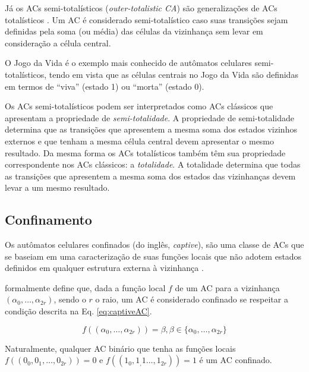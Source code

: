 Já os ACs semi-totalísticos (\textit{outer-totalistic CA}) são generalizações de ACs totalísticos \cite{weisstein2015outerTotalistic}. Um AC é considerado semi-totalístico caso suas transições sejam definidas pela soma (ou média) das células da vizinhança sem levar em consideração a célula central.

O Jogo da Vida \cite{GardnerM1970} é o exemplo mais conhecido de autômatos celulares semi-totalísticos, tendo em vista que as células centrais no Jogo da Vida são definidas em termos de ``viva'' (estado 1) ou ``morta'' (estado 0).

Os ACs semi-totalísticos podem ser interpretados como ACs clássicos que apresentam a propriedade de \textit{semi-totalidade}. A propriedade de semi-totalidade determina que as transições que apresentem a mesma soma dos estados vizinhos externos e que tenham a mesma célula central devem apresentar o mesmo resultado. Da mesma forma os ACs totalísticos também têm sua propriedade correspondente nos ACs clássicos: a \textit{totalidade}. A totalidade determina que todas as transições que apresentem a mesma soma dos estados das vizinhanças devem levar a um mesmo resultado.

\subsection{Confinamento}
Os autômatos celulares confinados (do inglês, \textit{captive}), são uma classe de ACs que se baseiam em uma caracterização de suas funções locais que não adotem estados definidos em qualquer estrutura externa à vizinhança \cite{theyssier2004captive}. 

 formalmente define que, dada a função local $f$ de um AC para a vizinhança $(\alpha_0, \dots, \alpha_{2r})$, sendo o $r$ o raio, um AC é considerado confinado se respeitar a condição descrita na Eq. \eqref{eq:captiveAC}.

\begin{equation}
f((\alpha_0, \dots, \alpha_{2r})) = \beta, \beta \in \{\alpha_0, \dots, \alpha_{2r}\}
\label{eq:captiveAC}
\end{equation}

Naturalmente, qualquer AC binário que tenha as funções locais $f((0_0, 0_1,\dots, 0_{2r})) = 0$ e $f((1_0, 1_,1\dots, 1_{2r})) = 1$ é um AC confinado.
